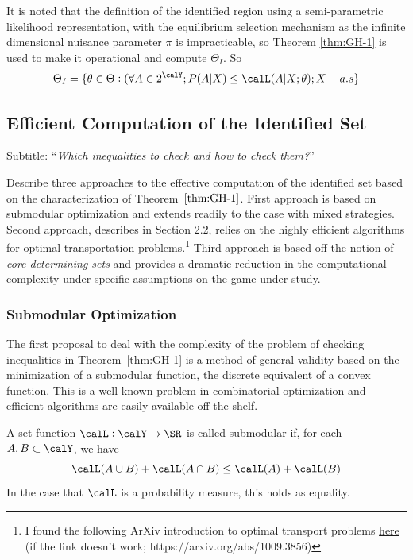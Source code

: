 It is noted that the definition of the identified region using a semi-parametric likelihood representation, with the equilibrium selection mechanism as the infinite dimensional nuisance parameter $\pi$ is impracticable, so Theorem \ref{thm:GH-1} is used to make it operational and compute $\Theta_I$. So
\[\Theta_I = \{\theta \in \Theta: (\forall A \in 2^\calY; P(A|X) \leq \calL(A|X;\theta); X-a.s\}\]

\subsection{Efficient Computation of the Identified Set}

Subtitle: ``\emph{Which inequalities to check and how to check them?}''

Describe three approaches to the effective computation of the identified set based on the characterization of Theorem~$\ref{thm:GH-1}$. First approach is based on submodular optimization and extends readily to the case with mixed strategies. Second approach, describes in Section 2.2, relies on the highly efficient algorithms for optimal transportation problems.\footnote{I found the following ArXiv introduction to optimal transport problems \href{https://arxiv.org/abs/1009.3856}{here} (if the link doesn't work; https://arxiv.org/abs/1009.3856)} Third approach is based off the notion of \emph{core determining sets} and provides a dramatic reduction in the computational complexity under specific assumptions on the game under study.

\subsubsection{Submodular Optimization}

The first proposal to deal with the complexity of the problem of checking inequalities in Theorem~\ref{thm:GH-1} is a method of general validity based on the minimization of a submodular function, the discrete equivalent of a convex function. This is a well-known problem in combinatorial optimization and efficient algorithms are easily available off the shelf.

\begin{definition}
	\label{def:GH-6}
	A set function $\calL:\calY\rightarrow\SR$ is called submodular if, for each $A, B \subset \calY$, we have
	\[\calL(A\cup B) + \calL(A\cap B) \leq \calL(A) + \calL(B)\]
	In the case that $\calL$ is a probability measure, this holds as equality.
\end{definition}

